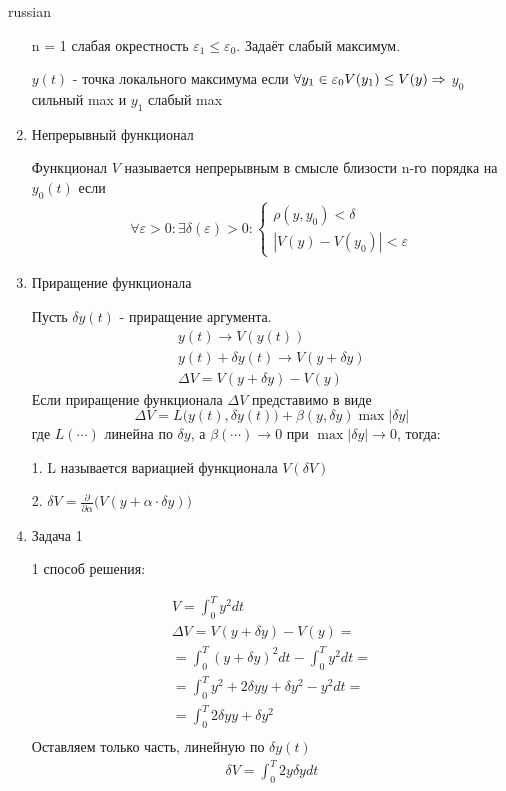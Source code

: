 \documentclass{article}
\begin{document}
\begin{otherlanguage*}{russian}
\begin{enumerate}
n = 1 слабая окрестность $\varepsilon_1 \le \varepsilon_0 $. Задаёт слабый максимум.

$y(t)$ - точка локального максимума если $\forall y_1 \in \varepsilon_0 \\
V(y_1) \le V(y) \Rightarrow$ $y_0$ сильный max и $y_1$ слабый max   

\item Непрерывный функционал

Функционал $V$ называется непрерывным в смысле близости n-го порядка на $y_0(t)$ если 
\begin{align}
\forall \varepsilon > 0:\exists \delta (\varepsilon) > 0: 
\begin{cases}\rho(y, y_0) < \delta \\
|V(y) - V(y_0) | < \varepsilon \end{cases}
\end{align}
\item Приращение функционала 

Пусть $\delta y(t)$ - приращение аргумента. 
\begin{align}
y(t) \rightarrow V(y(t)) \\
y(t) + \delta y(t) \rightarrow V(y + \delta y) \\
\Delta V = V(y + \delta y) - V(y) 
\end{align}
Если приращение функционала $\Delta V$ представимо в виде 
\begin{equation}
\Delta V = L\Big( y(t), \delta y(t) \Big) + \beta (y, \delta y) \max | \delta y| 
\end{equation}
где $L(\cdots)$ линейна по $\delta y$, а $\beta(\cdots) \rightarrow 0$ при $\max | \delta y| \rightarrow 0 $, тогда: 

1. L называется вариацией функционала $ V (\delta V) $

2. $\delta V = \frac{\partial}{\partial \alpha} \big( V(y + \alpha \cdot \delta y) \big)$

\item Задача 1

1 способ решения: 

\begin{align}
V = \int_0^T y^2 dt \\
\Delta V = V (y + \delta y) - V(y) =  \\
= \int_0^T (y + \delta y) ^2 dt - \int_0^T y^2 dt = \\
= \int_0^T y ^ 2 + 2 \delta y y + \delta y^2 - y ^ 2 dt = \\
= \int_0^T 2 \delta y y + \delta y^2 \\
\end{align}
Оставляем только часть, линейную по $\delta y(t)$
\begin{align}
\delta V = \int_0^T 2 y \delta y dt 
\end{align}


\end{enumerate}
\end{otherlanguage*}
\end{document}
